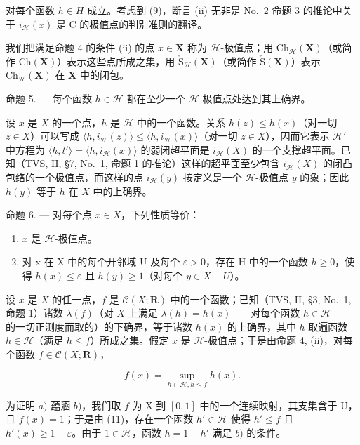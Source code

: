 对每个函数 \(h \in H\) 成立。考虑到 (9)，断言 (ii) 无非是 No.~2 命题 3 的推论中关于 \(i_{\mathcal{H}}(x)\) 是 C 的极值点的判别准则的翻译。

我们把满足命题 4 的条件 (ii) 的点 \(x \in \mathbf{X}\) 称为 \(\mathcal{H}\)-极值点；用 \(\mathrm{Ch}_{\mathcal{H}}(\mathbf{X})\)（或简作 \(\mathrm{Ch}(\mathbf{X})\)）表示这些点所成之集，用 \(\check{\mathrm{S}}_{\mathcal{H}}(\mathbf{X})\)（或简作 \(\check{\mathrm{S}}(\mathbf{X})\)）表示 \(\mathrm{Ch}_{\mathcal{H}}(\mathbf{X})\) 在 \(\mathbf{X}\) 中的闭包。

命题 5. --- 每个函数 \(h \in \mathcal{H}\) 都在至少一个 \(\mathcal{H}\)-极值点处达到其上确界。

设 \(x\) 是 \(X\) 的一个点，\(h\) 是 \(\mathcal{H}\) 中的一个函数。关系 \(h(z) \leqslant h(x)\)（对一切 \(z \in X\)）可以写成 \(\langle h, i_{\mathcal{H}}(z) \rangle \leqslant \langle h, i_{\mathcal{H}}(x) \rangle\)（对一切 \(z \in X\)），因而它表示 \(\mathcal{H}'\) 中方程为 \(\langle h, t' \rangle = \langle h, i_{\mathcal{H}}(x) \rangle\) 的弱闭超平面是 \(i_{\mathcal{H}}(X)\) 的一个支撑超平面。已知（TVS, II, §7, No.~1, 命题 1 的推论）这样的超平面至少包含 \(i_{\mathcal{H}}(X)\) 的闭凸包络的一个极值点，而这样的点 \(i_{\mathcal{H}}(y)\) 按定义是一个 \(\mathcal{H}\)-极值点 \(y\) 的象；因此 \(h(y)\) 等于 \(h\) 在 \(X\) 中的上确界。

命题 6. --- 对每个点 \(x \in X\)，下列性质等价：

\begin{enumerate}
\def\labelenumi{\alph{enumi})}
\item
  \(x\) 是 \(\mathcal{H}\)-极值点。
\item
  对 x 在 X 中的每个开邻域 U 及每个 \(\varepsilon > 0\)，存在 H 中的一个函数 \(h \geqslant 0\)，使得 \(h(x) \leqslant \varepsilon\) 且 \(h(y) \geqslant 1\)（对每个 \(y \in X - U\)）。
\end{enumerate}

设 \(x\) 是 \(X\) 的任一点，\(f\) 是 \(\mathcal{C}(X; \mathbf{R})\) 中的一个函数；已知（TVS, II, §3, No.~1, 命题 1）诸数 \(\lambda(f)\)（对 \(X\) 上满足 \(\lambda(h) = h(x)\)——对每个函数 \(h \in \mathcal{H}\)——的一切正测度而取的）的下确界，等于诸数 \(h(x)\) 的上确界，其中 \(h\) 取遍函数 \(h \in \mathcal{H}\)（满足 \(h \leqslant f\)）所成之集。假定 \(x\) 是 \(\mathcal{H}\)-极值点；于是由命题 4, (ii)，对每个函数 \(f \in \mathcal{C}(X; \mathbf{R})\)，

\[
f (x) = \sup _ {h \in \mathscr {H}, h \leqslant f} h (x).\tag{11}
\]

为证明 \(a)\) 蕴涵 \(b)\)，我们取 \(f\) 为 X 到 \([0,1]\) 中的一个连续映射，其支集含于 U，且 \(f(x)=1\)；于是由 (11)，存在一个函数 \(h'\in\mathscr{H}\) 使得 \(h'\leqslant f\) 且 \(h'(x)\geqslant 1-\varepsilon\)。由于 \(1\in\mathscr{H}\)，函数 \(h=1-h'\) 满足 \(b)\) 的条件。

